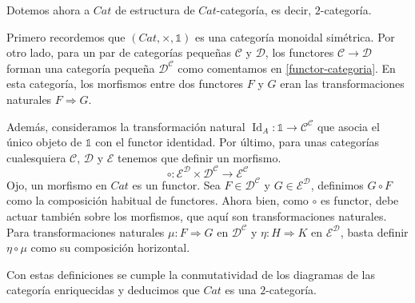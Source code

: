 \documentclass[12pt, twoside]{book}
\newcommand{\cat}{{\mathcal{C}}}
\newcommand{\Cat}{{Cat}}
\DeclareMathOperator{\Id}{Id}
\begin{document}
\begin{example}\label{cat-2-categoria}
Dotemos ahora a $\Cat$ de estructura de $\Cat$-categoría, es decir, $2$-categoría.

Primero recordemos que $(\Cat, \times, \mathbb{1})$ es una categoría monoidal simétrica.
Por otro lado, para un par de categorías pequeñas $\cat$ y $\mathcal{D}$, los functores $\cat \to \mathcal{D}$ forman una categoría pequeña $\mathcal{D}^\cat$ como comentamos en \ref{functor-categoria}.
En esta categoría, los morfismos entre dos functores $F$ y $G$ eran las transformaciones naturales $F \Rightarrow G$.

Además, consideramos la transformación natural $\Id_A \colon \mathbb{1} \to \cat^\cat$ que asocia el único objeto de $\mathbb{1}$ con el functor identidad.
Por último, para unas categorías cualesquiera $\cat$, $\mathcal{D}$ y $\mathcal{E}$ tenemos que definir un morfismo.
\[ \circ \colon \mathcal{E}^\mathcal{D} \times \mathcal{D}^\cat \to \mathcal{E}^\cat\]
Ojo, un morfismo en $\Cat$ es un functor.
Sea $F \in \mathcal{D}^\cat$ y $G \in \mathcal{E}^\mathcal{D}$, definimos $G \circ F$ como la composición habitual de functores.
Ahora bien, como $\circ$ es functor, debe actuar también sobre los morfismos, que aquí son transformaciones naturales.
Para transformaciones naturales $\mu \colon F \Rightarrow G$ en $\mathcal{D}^\cat$ y $\eta \colon H \Rightarrow K$ en $\mathcal{E}^\mathcal{D}$, basta definir $\eta \circ \mu$ como su composición horizontal.

Con estas definiciones se cumple la conmutatividad de los diagramas de las categoría enriquecidas y deducimos que $\Cat$ es una $2$-categoría.
\end{example}
\end{document}
